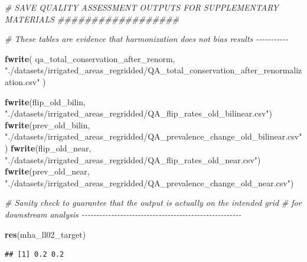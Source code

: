\documentclass[
  11pt,
]{article}
\newenvironment{Shaded}{\begin{snugshade}}{\end{snugshade}}
\newcommand{\CommentTok}[1]{\textcolor[rgb]{0.56,0.35,0.01}{\textit{#1}}}
\newcommand{\FunctionTok}[1]{\textcolor[rgb]{0.13,0.29,0.53}{\textbf{#1}}}
\newcommand{\NormalTok}[1]{#1}
\newcommand{\StringTok}[1]{\textcolor[rgb]{0.31,0.60,0.02}{#1}}
\begin{document}
\begin{Shaded}
\begin{Highlighting}[]
\CommentTok{\# SAVE QUALITY ASSESSMENT OUTPUTS FOR SUPPLEMENTARY MATERIALS \#\#\#\#\#\#\#\#\#\#\#\#\#\#\#\#\#\#}

\CommentTok{\# These tables are evidence that harmonization does not bias results {-}{-}{-}{-}{-}{-}{-}{-}{-}{-}{-}}

\FunctionTok{fwrite}\NormalTok{(}
\NormalTok{  qa\_total\_conservation\_after\_renorm,}
  \StringTok{"./datasets/irrigated\_areas\_regridded/QA\_total\_conservation\_after\_renormalization.csv"}
\NormalTok{)}

\FunctionTok{fwrite}\NormalTok{(flip\_old\_bilin, }\StringTok{"./datasets/irrigated\_areas\_regridded/QA\_flip\_rates\_old\_bilinear.csv"}\NormalTok{)}
\FunctionTok{fwrite}\NormalTok{(prev\_old\_bilin, }\StringTok{"./datasets/irrigated\_areas\_regridded/QA\_prevalence\_change\_old\_bilinear.csv"}\NormalTok{)}
\FunctionTok{fwrite}\NormalTok{(flip\_old\_near,  }\StringTok{"./datasets/irrigated\_areas\_regridded/QA\_flip\_rates\_old\_near.csv"}\NormalTok{)}
\FunctionTok{fwrite}\NormalTok{(prev\_old\_near,  }\StringTok{"./datasets/irrigated\_areas\_regridded/QA\_prevalence\_change\_old\_near.csv"}\NormalTok{)}

\CommentTok{\# Sanity check to guarantee that the output is actually on the intended grid }
\CommentTok{\# for downstream analysis {-}{-}{-}{-}{-}{-}{-}{-}{-}{-}{-}{-}{-}{-}{-}{-}{-}{-}{-}{-}{-}{-}{-}{-}{-}{-}{-}{-}{-}{-}{-}{-}{-}{-}{-}{-}{-}{-}{-}{-}{-}{-}{-}{-}{-}{-}{-}{-}{-}{-}{-}{-}{-}{-}}

\FunctionTok{res}\NormalTok{(mha\_ll02\_target)}
\end{Highlighting}
\end{Shaded}

\begin{verbatim}
## [1] 0.2 0.2
\end{verbatim}
\end{document}
